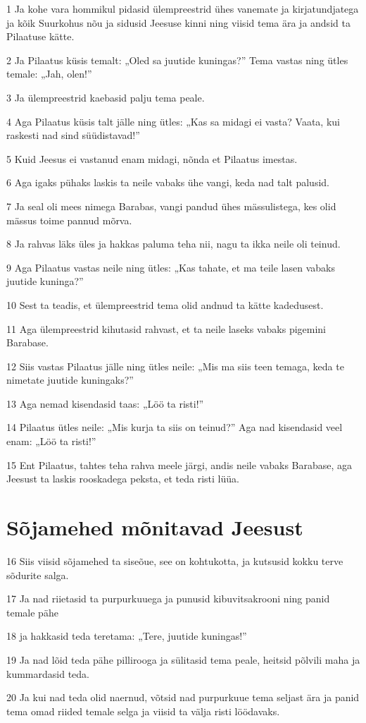 \par 1 Ja kohe vara hommikul pidasid ülempreestrid ühes vanemate ja kirjatundjatega ja kõik Suurkohus nõu ja sidusid Jeesuse kinni ning viisid tema ära ja andsid ta Pilaatuse kätte.
\par 2 Ja Pilaatus küsis temalt: „Oled sa juutide kuningas?” Tema vastas ning ütles temale: „Jah, olen!”
\par 3 Ja ülempreestrid kaebasid palju tema peale.
\par 4 Aga Pilaatus küsis talt jälle ning ütles: „Kas sa midagi ei vasta? Vaata, kui raskesti nad sind süüdistavad!”
\par 5 Kuid Jeesus ei vastanud enam midagi, nõnda et Pilaatus imestas.
\par 6 Aga igaks pühaks laskis ta neile vabaks ühe vangi, keda nad talt palusid.
\par 7 Ja seal oli mees nimega Barabas, vangi pandud ühes mässulistega, kes olid mässus toime pannud mõrva.
\par 8 Ja rahvas läks üles ja hakkas paluma teha nii, nagu ta ikka neile oli teinud.
\par 9 Aga Pilaatus vastas neile ning ütles: „Kas tahate, et ma teile lasen vabaks juutide kuninga?”
\par 10 Sest ta teadis, et ülempreestrid tema olid andnud ta kätte kadedusest.
\par 11 Aga ülempreestrid kihutasid rahvast, et ta neile laseks vabaks pigemini Barabase.
\par 12 Siis vastas Pilaatus jälle ning ütles neile: „Mis ma siis teen temaga, keda te nimetate juutide kuningaks?”
\par 13 Aga nemad kisendasid taas: „Löö ta risti!”
\par 14 Pilaatus ütles neile: „Mis kurja ta siis on teinud?” Aga nad kisendasid veel enam: „Löö ta risti!”
\par 15 Ent Pilaatus, tahtes teha rahva meele järgi, andis neile vabaks Barabase, aga Jeesust ta laskis rooskadega peksta, et teda risti lüüa.

\section*{Sõjamehed mõnitavad Jeesust}

\par 16 Siis viisid sõjamehed ta siseõue, see on kohtukotta, ja kutsusid kokku terve sõdurite salga.
\par 17 Ja nad riietasid ta purpurkuuega ja punusid kibuvitsakrooni ning panid temale pähe
\par 18 ja hakkasid teda teretama: „Tere, juutide kuningas!”
\par 19 Ja nad lõid teda pähe pillirooga ja sülitasid tema peale, heitsid põlvili maha ja kummardasid teda.
\par 20 Ja kui nad teda olid naernud, võtsid nad purpurkuue tema seljast ära ja panid tema omad riided temale selga ja viisid ta välja risti löödavaks.

